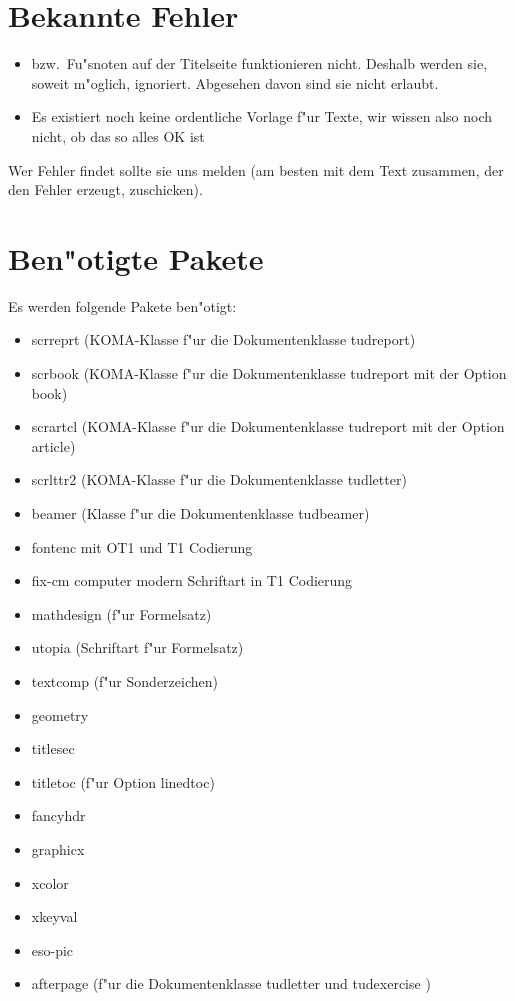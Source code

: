 \documentclass[twoside,colorback,accentcolor=tud4c,11pt]{tudreport}
\begin{document}
  \section{Bekannte Fehler}
 
   \begin{itemize}\itemsep-0.5ex
    \item {} bzw.\ Fu"snoten auf der Titelseite funktionieren
      nicht. Deshalb werden sie, soweit m"oglich, ignoriert.
      Abgesehen davon sind sie nicht erlaubt.
    \item Es existiert noch keine ordentliche Vorlage f"ur Texte, wir 
     wissen also noch nicht, ob das so alles OK ist
   \end{itemize}
   Wer Fehler findet sollte sie uns melden (am besten mit dem Text zusammen, der
   den Fehler erzeugt, zuschicken).

  \section{Ben"otigte Pakete}
    Es werden folgende Pakete ben"otigt:
   \begin{itemize}\itemsep-0.5ex
     \accentfont
     \item scrreprt   \textnormal{(KOMA-Klasse f"ur die Dokumentenklasse} tudreport\textnormal{)}
     \item scrbook    \textnormal{(KOMA-Klasse f"ur die Dokumentenklasse} tudreport \textnormal{mit der Option} book\textnormal{)}
     \item scrartcl   \textnormal{(KOMA-Klasse f"ur die Dokumentenklasse} tudreport \textnormal{mit der Option} article\textnormal{)}
     \item scrlttr2   \textnormal{(KOMA-Klasse f"ur die Dokumentenklasse} tudletter\textnormal{)}
     \item beamer     \textnormal{(Klasse f"ur die Dokumentenklasse} tudbeamer\textnormal{)}
     \item fontenc    \textnormal{mit} OT1 \textnormal{und} T1 \textnormal{Codierung}
     \item fix-cm     computer modern \textnormal{Schriftart in} T1 \textnormal{Codierung}
     \item mathdesign \textnormal{(f"ur Formelsatz)}
     \item utopia     \textnormal{(Schriftart f"ur Formelsatz)}
     \item textcomp   \textnormal{(f"ur Sonderzeichen)}
     \item geometry
     \item titlesec
     \item titletoc   \textnormal{(f"ur Option} linedtoc\textnormal{)}
     \item fancyhdr
     \item graphicx
     \item xcolor
     \item xkeyval
     \item eso-pic
     \item afterpage   \textnormal{(f"ur die Dokumentenklasse} tudletter \textnormal{und} tudexercise \textnormal{)}
   \end{itemize}
  
\end{document}
